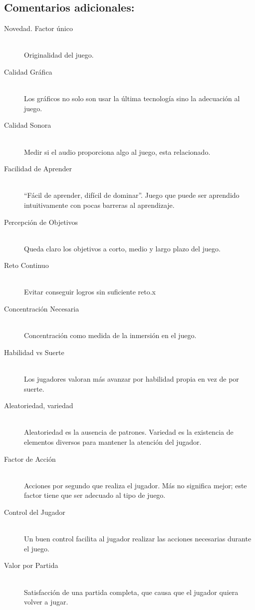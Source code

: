 \documentclass[12pt,a4paper]{article}
\begin{document}
\subsection*{Comentarios adicionales:}

\centering{}

\newpage

\begin{description}
\item[Novedad. Factor único] \hfill \\
  Originalidad del juego.
\item[Calidad Gráfica] \hfill \\
  Los gráficos no solo son usar la última tecnología sino la adecuación al
  juego.
\item[Calidad Sonora] \hfill \\
  Medir si el audio proporciona algo al juego, esta relacionado.
\item[Facilidad de Aprender] \hfill \\
  ``Fácil de aprender, difícil de dominar''. Juego que puede ser aprendido
  intuitivamente con pocas barreras al aprendizaje.
\item[Percepción de Objetivos] \hfill \\
  Queda claro los objetivos a corto, medio y largo plazo del juego.
\item[Reto Continuo] \hfill \\
  Evitar conseguir logros sin suficiente reto.x
\item[Concentración Necesaria] \hfill \\
  Concentración como medida de la inmersión en el juego.
\item[Habilidad vs Suerte] \hfill \\
  Los jugadores valoran más avanzar por habilidad propia en vez de por suerte.
\item[Aleatoriedad, variedad] \hfill \\
  Aleatoriedad es la ausencia de patrones. Variedad es la existencia de
  elementos diversos para mantener la atención del jugador.
\item[Factor de Acción] \hfill \\
  Acciones por segundo que realiza el jugador. Más no significa mejor; este
  factor tiene que ser adecuado al tipo de juego.
\item[Control del Jugador] \hfill \\
  Un buen control facilita al jugador realizar las acciones necesarias durante
  el juego.
\item[Valor por Partida] \hfill \\
  Satisfacción de una partida completa, que causa que el jugador quiera volver a
  jugar.

\end{description}
\end{document}
